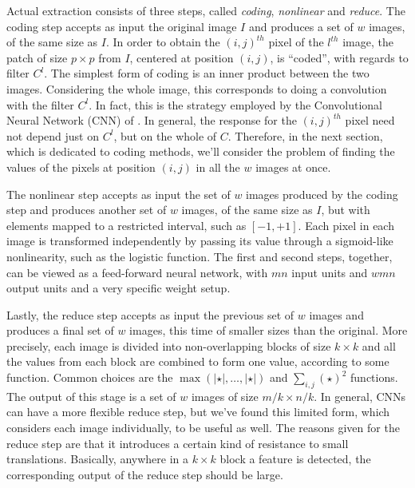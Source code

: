 \documentclass[runningheads,a4paper]{llncs}
\newcommand{\hctimes}[2]{{#1}\!\times\!{#2}}
\begin{document}
Actual extraction consists of three steps, called \emph{coding}, \emph{nonlinear} and \emph{reduce}. The coding step accepts as input the original image $I$ and produces a set of $w$ images, of the same size as $I$. In order to obtain the $(i,j)^{th}$ pixel of the $l^{th}$ image, the patch of size $\hctimes{p}{p}$ from $I$, centered at position $(i,j)$, is ``coded'', with regards to filter $C^l$. The simplest form of coding is an inner product between the two images. Considering the whole image, this corresponds to doing a convolution with the filter $C^l$. In fact, this is the strategy employed by the Convolutional Neural Network (CNN) of \cite{gradient-based-learning}. In general, the response for the $(i,j)^{th}$ pixel need not depend just on $C^l$, but on the whole of $C$. Therefore, in the next section, which is dedicated to coding methods, we'll consider the problem of finding the values of the pixels at position $(i,j)$ in all the $w$ images at once.

The nonlinear step accepts as input the set of $w$ images produced by the coding step and produces another set of $w$ images, of the same size as $I$, but with elements mapped to a restricted interval, such as $[-1,+1]$. Each pixel in each image is transformed independently by passing its value through a sigmoid-like nonlinearity, such as the logistic function. The first and second steps, together, can be viewed as a feed-forward neural network, with $mn$ input units and $wmn$ output units and a very specific weight setup.

Lastly, the reduce step accepts as input the previous set of $w$ images and produces a final set of $w$ images, this time of smaller sizes than the original. More precisely, each image is divided into non-overlapping blocks of size $\hctimes{k}{k}$ and all the values from each block are combined to form one value, according to some function. Common choices are the $\max(\left|\star\right|,\dots,\left|\star\right|)$ and $\sum_{i,j}{(\star)^2}$ functions. The output of this stage is a set of $w$ images of size $\hctimes{m / k}{n / k}$. In general, CNNs can have a more flexible reduce step, but we've found this limited form, which considers each image individually, to be useful as well. The reasons given for the reduce step are that it introduces a certain kind of resistance to small translations. Basically, anywhere in a $\hctimes{k}{k}$ block a feature is detected, the corresponding output of the reduce step should be large.
\end{document}

